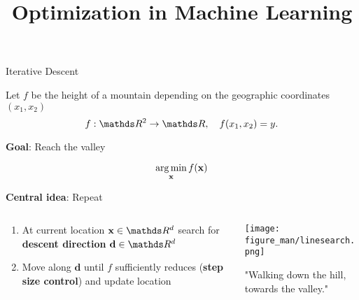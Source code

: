 \documentclass[11pt,compress,t,notes=noshow, xcolor=table]{beamer}
\title{Optimization in Machine Learning}
\date{}
\begin{document}
\lecture{\inserttitle}
\sloppy

\begin{vbframe}{Iterative Descent}

	Let $f$ be the height of a mountain depending on the geographic coordinates $(x_1, x_2)$
	\vspace*{-0.1cm}
	$$
	f: \R^2 \to \R, \quad f(x_1, x_2) = y.
	$$
	
	\textbf{Goal}: Reach the valley

	$$
	\operatorname*{arg\,min}_{\mathbf{x}} f(\mathbf{x})
	$$
	
	\textbf{Central idea}: Repeat
	\vspace*{-0.15cm}
	\begin{columns}
		\begin{column}{0.58\textwidth}
			\begin{enumerate}
				\item At current location $\xv \in \R^d$ search for \textbf{descent direction} $\mathbf{d} \in \R^d$ 
			  	\item Move along $\mathbf{d}$ until $f$ \glqq sufficiently\grqq{} reduces (\textbf{step size control}) and update location
			\end{enumerate}
		\end{column}
		\begin{column}{0.4\textwidth}
			\begin{center}
			\texttt{[image: figure\_man/linesearch.png]}
			\hspace{2cm} \begin{footnotesize} "Walking down the hill, towards the valley." \end{footnotesize}\\
			\end{center}
		\end{column}
	\end{columns}
	
\end{vbframe}
\end{document}

